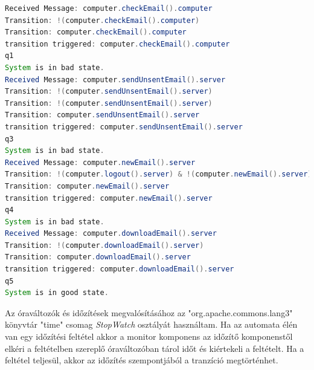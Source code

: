 \begin{lstlisting}[language=java, frame=single, float=ht!, caption={Időzítéses példa monitor kimenete.},captionpos=b]
Received Message: computer.checkEmail().computer
Transition: !(computer.checkEmail().computer)
Transition: computer.checkEmail().computer
transition triggered: computer.checkEmail().computer
q1
System is in bad state.
Received Message: computer.sendUnsentEmail().server
Transition: !(computer.sendUnsentEmail().server)
Transition: !(computer.sendUnsentEmail().server)
Transition: computer.sendUnsentEmail().server
transition triggered: computer.sendUnsentEmail().server
q3
System is in bad state.
Received Message: computer.newEmail().server
Transition: !(computer.logout().server) & !(computer.newEmail().server)
Transition: computer.newEmail().server
transition triggered: computer.newEmail().server
q4
System is in bad state.
Received Message: computer.downloadEmail().server
Transition: !(computer.downloadEmail().server)
Transition: computer.downloadEmail().server
transition triggered: computer.downloadEmail().server
q5
System is in good state.
\end{lstlisting}

Az óraváltozók és időzítések megvalósításához az "org.apache.commons.lang3" könyvtár "time" csomag \textit{StopWatch} osztályát használtam.
Ha az automata élén van egy időzítési feltétel akkor a monitor komponens az időzítő komponenstől elkéri a feltételben szereplő óraváltozóban tárol időt és kiértekeli a feltételt.
Ha a feltétel teljesül, akkor az időzítés szempontjából a tranzíció megtörténhet.